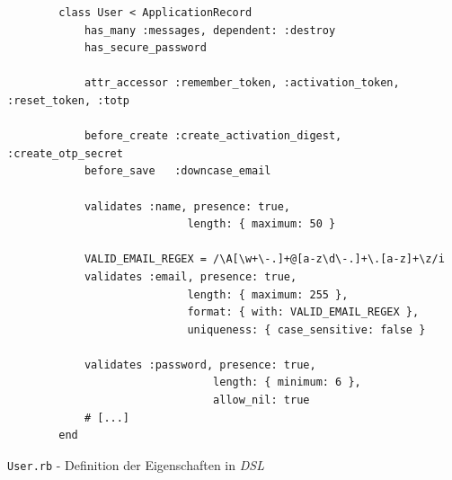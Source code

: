 \documentclass[11pt,a4paper,ngerman]{scrreprt}
\begin{document}
\begin{listing}[htpb]
    \begin{verbatim}
        class User < ApplicationRecord
            has_many :messages, dependent: :destroy
            has_secure_password
        
            attr_accessor :remember_token, :activation_token, :reset_token, :totp
        
            before_create :create_activation_digest, :create_otp_secret
            before_save   :downcase_email
        
            validates :name, presence: true,
                            length: { maximum: 50 }
        
            VALID_EMAIL_REGEX = /\A[\w+\-.]+@[a-z\d\-.]+\.[a-z]+\z/i
            validates :email, presence: true,
                            length: { maximum: 255 },
                            format: { with: VALID_EMAIL_REGEX },
                            uniqueness: { case_sensitive: false }
        
            validates :password, presence: true,
                                length: { minimum: 6 },
                                allow_nil: true
            # [...]
        end
    \end{verbatim}
    \caption{\texttt{User.rb} - Definition der Eigenschaften in \textit{DSL}}
    \label{lst:User.rb-dsl}
\end{listing}
\end{document}

